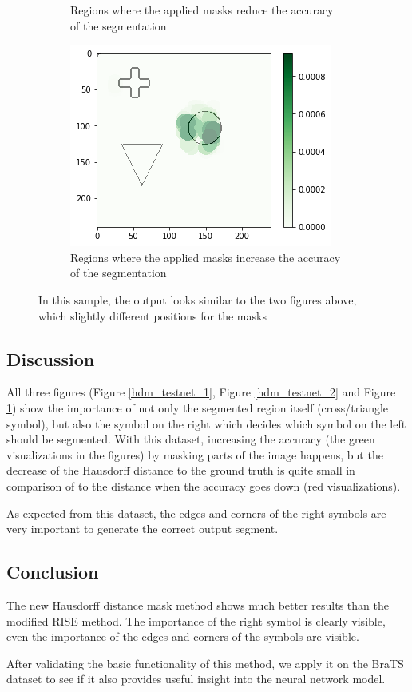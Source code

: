 \begin{figure}[H]
\begin{subfigure}[t]{.34\textwidth}
        \caption{Regions where the applied masks reduce the accuracy of the segmentation}
    \end{subfigure}\hfill%
    \begin{subfigure}[t]{.34\textwidth}
        \centering
        \includegraphics[width=\linewidth]{chapters/06_hdm/testnet/11.png}
        \caption{Regions where the applied masks increase the accuracy of the segmentation}
    \end{subfigure}
    \caption{In this sample, the output looks similar to the two figures above, which slightly different positions for the masks}
    \label{hdm_testnet_3}
\end{figure}

\subsection{Discussion}
All three figures (Figure \ref{hdm_testnet_1}, Figure \ref{hdm_testnet_2} and Figure \ref{hdm_testnet_3}) show the importance of not only the segmented region itself (cross/triangle symbol), but also the symbol on the right which decides which symbol on the left should be segmented. With this dataset, increasing the accuracy (the green visualizations in the figures) by masking parts of the image happens, but the decrease of the Hausdorff distance to the ground truth is quite small in comparison of to the distance when the accuracy goes down (red visualizations).

As expected from this dataset, the edges and corners of the right symbols are very important to generate the correct output segment.

\subsection{Conclusion}
The new Hausdorff distance mask method shows much better results than the modified RISE method. The importance of the right symbol is clearly visible, even the importance of the edges and corners of the symbols are visible.

After validating the basic functionality of this method, we apply it on the BraTS dataset to see if it also provides useful insight into the neural network model.

